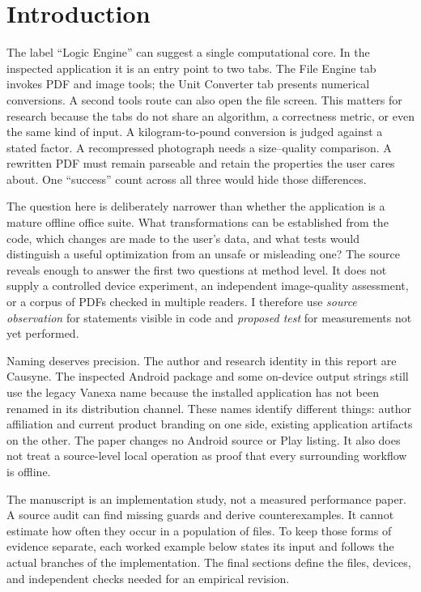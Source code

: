\documentclass[10pt,letterpaper]{article}
\begin{document}
\section{Introduction}

The label ``Logic Engine'' can suggest a single computational core. In the inspected application it is an entry point to two tabs. The File Engine tab invokes PDF and image tools; the Unit Converter tab presents numerical conversions. A second tools route can also open the file screen. This matters for research because the tabs do not share an algorithm, a correctness metric, or even the same kind of input. A kilogram-to-pound conversion is judged against a stated factor. A recompressed photograph needs a size--quality comparison. A rewritten PDF must remain parseable and retain the properties the user cares about. One ``success'' count across all three would hide those differences.

The question here is deliberately narrower than whether the application is a mature offline office suite. What transformations can be established from the code, which changes are made to the user's data, and what tests would distinguish a useful optimization from an unsafe or misleading one? The source reveals enough to answer the first two questions at method level. It does not supply a controlled device experiment, an independent image-quality assessment, or a corpus of PDFs checked in multiple readers. I therefore use \emph{source observation} for statements visible in code and \emph{proposed test} for measurements not yet performed.

Naming deserves precision. The author and research identity in this report are Causyne. The inspected Android package and some on-device output strings still use the legacy Vanexa name because the installed application has not been renamed in its distribution channel. These names identify different things: author affiliation and current product branding on one side, existing application artifacts on the other. The paper changes no Android source or Play listing. It also does not treat a source-level local operation as proof that every surrounding workflow is offline.

The manuscript is an implementation study, not a measured performance paper. A source audit can find missing guards and derive counterexamples. It cannot estimate how often they occur in a population of files. To keep those forms of evidence separate, each worked example below states its input and follows the actual branches of the implementation. The final sections define the files, devices, and independent checks needed for an empirical revision.
\end{document}
